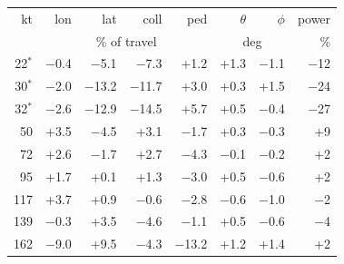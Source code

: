 \begin{tabular}{@{}rrrrrrrr@{}}
\toprule
kt & lon & lat & coll & ped & $\theta$ & $\phi$ & power \\
 & \multicolumn{4}{c}{\% of travel} & \multicolumn{2}{c}{deg} & \% \\
\midrule
22$^*$ & $-$0.4 & $-$5.1 & $-$7.3 & +1.2 & +1.3 & $-$1.1 & $-$12 \\
30$^*$ & $-$2.0 & $-$13.2 & $-$11.7 & +3.0 & +0.3 & +1.5 & $-$24 \\
32$^*$ & $-$2.6 & $-$12.9 & $-$14.5 & +5.7 & +0.5 & $-$0.4 & $-$27 \\
50 & +3.5 & $-$4.5 & +3.1 & $-$1.7 & +0.3 & $-$0.3 & +9 \\
72 & +2.6 & $-$1.7 & +2.7 & $-$4.3 & $-$0.1 & $-$0.2 & +2 \\
95 & +1.7 & +0.1 & +1.3 & $-$3.0 & +0.5 & $-$0.6 & +2 \\
117 & +3.7 & +0.9 & $-$0.6 & $-$2.8 & $-$0.6 & $-$1.0 & $-$2 \\
139 & $-$0.3 & +3.5 & $-$4.6 & $-$1.1 & +0.5 & $-$0.6 & $-$4 \\
162 & $-$9.0 & +9.5 & $-$4.3 & $-$13.2 & +1.2 & +1.4 & +2 \\
\bottomrule
\end{tabular}
